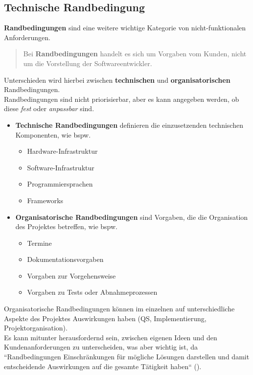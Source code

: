 \subsection*{Technische Randbedingung}
\textbf{Randbedingungen} sind eine weitere wichtige Kategorie von nicht-funktionalen Anforderungen.

\vspace{2mm}
\begin{tcolorbox}
    \blockquote[{\cite[65, Hervorhebung eigene]{Wed09}}]{
        Bei \textbf{Randbedingungen} handelt es sich um Vorgaben vom Kunden, nicht um die Vorstellung der Softwareentwickler.
    }
\end{tcolorbox}
\vspace{2mm}

\noindent
Unterschieden wird hierbei zwischen \textbf{technischen} und \textbf{organisatorischen} Randbedingungen.\\

\noindent
Randbedingungen sind nicht priorisierbar, aber es kann angegeben werden, ob diese \textit{fest} oder \textit{anpassbar} sind.

\begin{itemize}
    \item \textbf{Technische Randbedingungen} definieren die einzusetzenden technischen Komponenten, wie bspw.
        \begin{itemize}
            \item Hardware-Infrastruktur
            \item Software-Infrastruktur
            \item Programmiersprachen
            \item Frameworks
        \end{itemize}
    \item \textbf{Organisatorische Randbedingungen} sind Vorgaben, die die Organisation des Projektes betreffen, wie bspw.
    \begin{itemize}
        \item Termine
        \item Dokumentationsvorgaben
        \item Vorgaben zur Vorgehensweise
        \item Vorgaben zu Tests oder Abnahmeprozessen
    \end{itemize}
\end{itemize}

\noindent
Organisatorische Randbedingungen können im einzelnen auf unterschiedliche Aspekte des Projektes Auswirkungen haben (QS, Implementierung, Projektorganisation).\\

\noindent
Es kann mitunter herausfordernd sein, zwischen eigenen Ideen und den Kundenanforderungen zu unterscheiden, was aber wichtig ist, da ``Randbedingungen Einschränkungen für mögliche Lösungen darstellen und damit entscheidende Auswirkungen auf die gesamte Tätigkeit haben`` (\cite[65]{Wed09}).